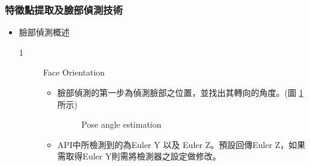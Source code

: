 \documentclass[12pt]{article}  %
\theoremstyle{plain}
\begin{document}
\subsubsection{特徵點提取及臉部偵測技術}
\begin{itemize}
\item 臉部偵測概述
\begin{description}
\item[1] Face Orientation
\begin{itemize}
\item 臉部偵測的第一步為偵測臉部之位置，並找出其轉向的角度。(圖 \ref{Pose angle estimation} 所示)
\begin{figure}[htbp]
\quad
{}
\caption{Pose angle estimation} \label{Pose angle estimation}
\end{figure}
\item API中所檢測到的為Euler Y 以及 Euler Z。預設回傳Euler Z，如果需取得Euler Y則需將檢測器之設定做修改。
\end{itemize}


\end{description}
\end{itemize}
\end{document}
